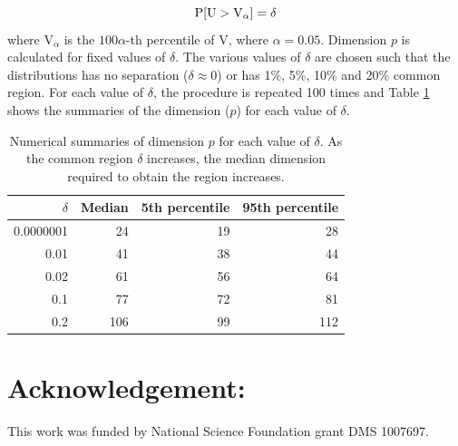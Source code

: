 
$$\hbox{P}[\mbox{U} > \mbox{V}_{\alpha}] = \delta$$ where $\mbox{V}_{\alpha}$ is the $100\alpha$-th percentile of V, where $\alpha = 0.05$.  Dimension $p$ is calculated for fixed values of $\delta$. The various values of $\delta$ are chosen such that the distributions has no separation ($\delta \approx 0$) or has 1\%, 5\%, 10\% and 20\% common region. For each value of $\delta$, the procedure is repeated 100 times and Table \ref{tab:dimen} shows the summaries of the dimension ($p$) for each value of $\delta$.

\begin{table}[htbp]
\begin{center}
\caption{Numerical summaries of dimension $p$ for each value of $\delta$. As the common region $\delta$ increases, the median dimension required to obtain the region increases.}
\begin{tabular}{rrrr}
  \hline
  \hline
  $\delta$ & Median & 5th percentile & 95th percentile \\
  \hline
  0.0000001 & 24 & 19 & 28 \\
      0.01 & 41 & 38 & 44\\
   0.02 & 61 & 56 & 64 \\
     0.1 & 77 & 72 & 81\\   
     0.2 & 106 & 99 & 112\\ 
      \hline
\end{tabular}
\label{tab:dimen}
\end{center}
\end{table}



\section{Acknowledgement:}
%
This work was funded by National Science Foundation grant DMS 1007697.

%




